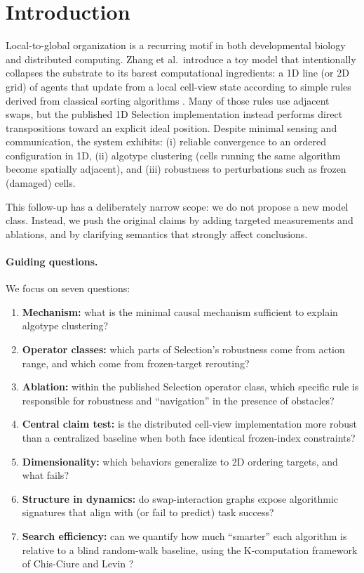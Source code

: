 \documentclass[11pt]{article}
\begin{document}
\section{Introduction}
\label{sec:intro}
Local-to-global organization is a recurring motif in both developmental biology and distributed
computing. Zhang et al.\ introduce a toy model that intentionally collapses the substrate to its
barest computational ingredients: a 1D line (or 2D grid) of agents that update from a local
cell-view state according to simple rules derived from classical sorting algorithms
\cite{zang2024classical}. Many of those rules use adjacent swaps, but the published 1D Selection
implementation instead performs direct transpositions toward an explicit ideal position.
Despite minimal sensing and communication, the system exhibits:
(i) reliable convergence to an ordered configuration in 1D,
(ii) algotype clustering (cells running the same algorithm become spatially adjacent),
and (iii) robustness to perturbations such as frozen (damaged) cells.

This follow-up has a deliberately narrow scope: we do not propose a new model class.
Instead, we push the original claims by adding targeted measurements and ablations, and by clarifying
semantics that strongly affect conclusions.

\paragraph{Guiding questions.}
We focus on seven questions:
\begin{enumerate}
  \item \textbf{Mechanism:} what is the minimal causal mechanism sufficient to explain algotype
  clustering?
  \item \textbf{Operator classes:} which parts of Selection's robustness come from action range,
  and which come from frozen-target rerouting?
  \item \textbf{Ablation:} within the published Selection operator class, which specific rule is
  responsible for robustness and ``navigation'' in the presence of obstacles?
  \item \textbf{Central claim test:} is the distributed cell-view implementation more robust than a
  centralized baseline when both face identical frozen-index constraints?
  \item \textbf{Dimensionality:} which behaviors generalize to 2D ordering targets, and what fails?
  \item \textbf{Structure in dynamics:} do swap-interaction graphs expose algorithmic signatures that
  align with (or fail to predict) task success?
  \item \textbf{Search efficiency:} can we quantify how much ``smarter'' each algorithm is relative to
  a blind random-walk baseline, using the K-computation framework of Chis-Ciure and Levin
  \cite{chisciure2025cognition}?
\end{enumerate}
\end{document}
